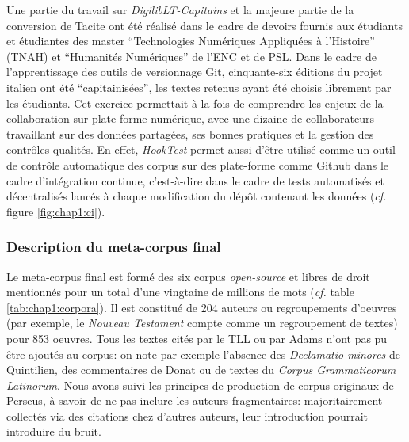 Une partie du travail sur \textit{DigilibLT-Capitains} et la majeure partie de la conversion de Tacite ont été réalisé dans le cadre de devoirs fournis aux étudiants et étudiantes des master \enquote{Technologies Numériques Appliquées à l'Histoire} (TNAH) et \enquote{Humanités Numériques} de l'ENC et de PSL. Dans le cadre de l'apprentissage des outils de versionnage Git, cinquante-six éditions du projet italien ont été \enquote{capitainisées}, les textes retenus ayant été choisis librement par les étudiants. Cet exercice permettait à la fois de comprendre les enjeux de la collaboration sur plate-forme numérique, avec une dizaine de collaborateurs travaillant sur des données partagées, ses bonnes pratiques et la gestion des contrôles qualités. En effet, \textit{HookTest} permet aussi d'être utilisé comme un outil de contrôle automatique des corpus sur des plate-forme comme Github dans le cadre d'intégration continue, c'est-à-dire dans le cadre de tests automatisés et décentralisés lancés à chaque modification du dépôt contenant les données (\textit{cf.} figure \ref{fig:chap1:ci}).

    
\subsubsection{Description du meta-corpus final}

Le meta-corpus final est formé des six corpus \textit{open-source} et libres de droit mentionnés pour un total d'une vingtaine de millions de mots (\textit{cf.} table \ref{tab:chap1:corpora}). Il est constitué de 204 auteurs ou regroupements d'oeuvres (par exemple, le \textit{Nouveau Testament} compte comme un regroupement de textes) pour 853 oeuvres. Tous les textes cités par le TLL ou par Adams n'ont pas pu être ajoutés au corpus: on note par exemple l'absence des \textit{Declamatio minores} de Quintilien, des commentaires de Donat ou de textes du \textit{Corpus Grammaticorum Latinorum}. Nous avons suivi les principes de production de corpus originaux de Perseus, à savoir de ne pas inclure les auteurs fragmentaires: majoritairement collectés via des citations chez d'autres auteurs, leur introduction pourrait introduire du bruit. 

